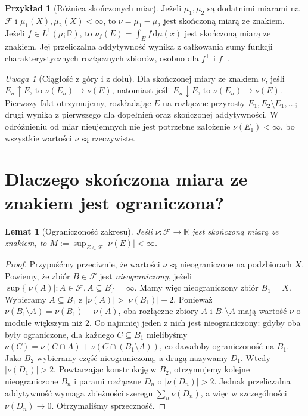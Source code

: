 \documentclass[11pt,a4paper,oneside]{book}
\numberwithin{equation}{chapter}
\theoremstyle{plain}
\newtheorem{lemat}[twierdzenie]{Lemat}
\theoremstyle{definition}
\newtheorem{przyklad}[twierdzenie]{Przykład}
\theoremstyle{remark}
\newtheorem{uwaga}[twierdzenie]{Uwaga}
\begin{document}
\begin{przyklad}[Różnica skończonych miar]
Jeżeli $\mu_1,\mu_2$ są dodatnimi miarami na $\mathcal F$
i $\mu_1(X),\mu_2(X)<\infty$, to $\nu=\mu_1-\mu_2$
jest skończoną miarą ze znakiem.
Jeżeli $f\in L^1(\mu;\mathbb R)$, to
$\nu_f(E)=\int_E f\,\mathrm d\mu(x)$ jest skończoną miarą ze znakiem.
Jej przeliczalna addytywność wynika z całkowania sumy
funkcji charakterystycznych rozłącznych zbiorów, osobno dla $f^+$ i $f^-$.
\end{przyklad}

\begin{uwaga}[Ciągłość z góry i z dołu]
Dla skończonej miary ze znakiem $\nu$, jeśli
$E_n\uparrow E$, to $\nu(E_n)\to\nu(E)$, natomiast
jeśli $E_n\downarrow E$, to $\nu(E_n)\to\nu(E)$.
Pierwszy fakt otrzymujemy, rozkładając $E$ na rozłączne
przyrosty $E_1,E_2\setminus E_1,\dots$; drugi wynika
z pierwszego dla dopełnień oraz skończonej addytywności.
W odróżnieniu od miar nieujemnych nie jest potrzebne
założenie $\nu(E_1)<\infty$, bo wszystkie wartości
$\nu$ są rzeczywiste.
\end{uwaga}

\section{Dlaczego skończona miara ze znakiem jest ograniczona?}
\begin{lemat}[Ograniczoność zakresu]
\label{lem:bounded-signed-16}
Jeśli $\nu:\mathcal F\to\mathbb R$ jest skończoną
miarą ze znakiem, to $M:=\sup_{E\in\mathcal F}|\nu(E)|<\infty$.
\end{lemat}
\begin{proof}
Przypuśćmy przeciwnie, że wartości $\nu$ są nieograniczone
na podzbiorach $X$. Powiemy, że zbiór $B\in\mathcal F$
jest \emph{nieograniczony}, jeżeli
$\sup\{|\nu(A)|:A\in\mathcal F,A\subseteq B\}=\infty$.
Mamy więc nieograniczony zbiór $B_1=X$.
Wybieramy $A\subseteq B_1$ z
$|\nu(A)|>|\nu(B_1)|+2$. Ponieważ
$\nu(B_1\setminus A)=\nu(B_1)-\nu(A)$,
oba rozłączne zbiory $A$ i $B_1\setminus A$ mają
wartość $\nu$ o module większym niż $2$.
Co najmniej jeden z nich jest nieograniczony: gdyby oba
były ograniczone, dla każdego $C\subseteq B_1$ mielibyśmy
$\nu(C)=\nu(C\cap A)+\nu(C\cap(B_1\setminus A))$,
co dawałoby ograniczoność na $B_1$.
Jako $B_2$ wybieramy część nieograniczoną, a drugą
nazywamy $D_1$. Wtedy $|\nu(D_1)|>2$.
Powtarzając konstrukcję w $B_2$, otrzymujemy kolejne
nieograniczone $B_n$ i parami rozłączne $D_n$
o $|\nu(D_n)|>2$. Jednak przeliczalna addytywność
wymaga zbieżności szeregu $\sum_n\nu(D_n)$,
a więc w szczególności $\nu(D_n)\to0$.
Otrzymaliśmy sprzeczność.
\end{proof}
\end{document}
